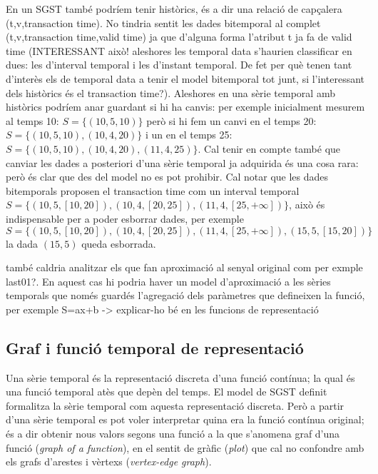  En un SGST
també podríem tenir històrics, és a dir una relació de capçalera
(t,v,transaction time). No tindria sentit les dades bitemporal al
complet (t,v,transaction time,valid time) ja que d'alguna forma
l'atribut t ja fa de valid time (INTERESSANT això! aleshores les
temporal data s'haurien classificar en dues: les d'interval temporal i
les d'instant temporal. De fet per què tenen tant d'interès els de
temporal data a tenir el model bitemporal tot junt, si l'interessant
dels històrics és el transaction time?).  Aleshores en una sèrie
temporal amb històrics podríem anar guardant si hi ha canvis: per
exemple inicialment mesurem al temps 10: $S=\{(10,5,10)\}$ però si hi
fem un canvi en el temps 20: $S=\{(10,5,10),(10,4,20)\}$ i un en el
temps 25: $S=\{(10,5,10),(10,4,20),(11,4,25)\}$. Cal tenir en compte
també que canviar les dades a posteriori d'una sèrie temporal ja
adquirida és una cosa rara: però és clar que des del model no es pot
prohibir. Cal notar que les dades bitemporals proposen el transaction
time com un interval temporal
$S=\{(10,5,[10,20]),(10,4,[20,25]),(11,4,[25,+\infty])\}$, això és
indispensable per a poder esborrar dades, per exemple
$S=\{(10,5,[10,20]),(10,4,[20,25]),(11,4,[25,+\infty]),(15,5,[15,20])\}$
la dada $(15,5)$ queda esborrada.



també caldria analitzar els que fan aproximació al senyal original com per exmple last01?. En aquest cas hi podria haver un model d'aproximació a les sèries temporals que només guardés l'agregació dels paràmetres que defineixen la funció, per exemple S=ax+b -> explicar-ho bé en les funcions de representació



\subsection{Graf i funció temporal de representació}
\label{sec:model:repr}

Una sèrie temporal és la representació discreta d'una funció contínua;
la qual és una funció temporal atès que depèn del temps. El model de
SGST definit formalitza la sèrie temporal com aquesta
representació discreta. Però a partir d'una sèrie temporal es pot
voler interpretar quina era la funció contínua original; és a dir
obtenir nous valors segons una funció a la que s'anomena graf d'una
funció (\emph{graph of a function}), en el sentit de gràfic
(\emph{plot}) que cal no confondre amb els grafs d'arestes i vèrtexs
(\emph{vertex-edge graph}).

